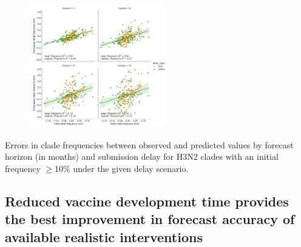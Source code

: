 \documentclass[9pt,lineno]{elife}
\begin{document}
\begin{figure}[htb]
%
{\includegraphics[width=6cm]{figures/h3n2_forecast_frequency_errors_by_initial_frequency_errors_delay_and_horizon}}\label{figsupp:h3n2_forecast_clade_frequency_errors_by_initial_frequency_errors}
%
\label{figdata:h3n2_clade_frequencies}
\label{figsrccode:forecast_clade_frequency_errors}
\end{figure}

\begin{table}[htb]
  \begin{center}
    
    \caption{Errors in clade frequencies between observed and predicted values by forecast horizon (in months) and submission delay for H3N2 clades with an initial frequency $\geq$10\% under the given delay scenario.}
    \label{tab:h3n2_forecast_clade_frequency_errors}
  \end{center}
\end{table}

\subsection{Reduced vaccine development time provides the best improvement in forecast accuracy of available realistic interventions}
\end{document}
